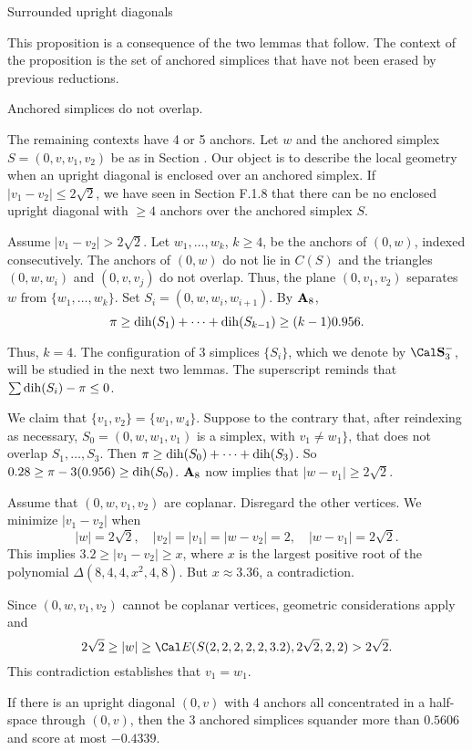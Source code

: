 \subhead {} Surrounded upright diagonals\endsubhead

This proposition is a consequence of the two lemmas that follow.
The context of the proposition is the set of anchored simplices
that have not been erased by previous reductions.

  Anchored simplices do not overlap.
\endproclaim


The remaining contexts have 4 or  5 anchors.
Let $w$ and the anchored simplex $S=(0,v,v_1,v_2)$ 
be as in Section .
Our object is to describe the local geometry when an
upright diagonal is enclosed over an anchored simplex.
If $|v_1-v_2|\le 2\sqrt{2}$, we have seen in Section F.1.8
that there can be no enclosed upright diagonal
with $\ge 4$ anchors over the anchored
simplex $S$.

Assume  $|v_1-v_2|>2\sqrt{2}$.  
Let $w_1,\ldots,w_k$, $k\ge4$,
be the anchors of $(0,w)$, indexed consecutively.
The anchors of $(0,w)$
do not lie in $C(S)$ and the
triangles $(0,w,w_i)$ and $(0,v,v_j)$ do not overlap.
Thus, the plane $(0,v_1,v_2)$ separates $w$ from $\{w_1,\ldots,w_k\}$.
Set $S_i=(0,w,w_i,w_{i+1})$. By ${\bold A}_8$,
$$\pi\ge \operatorname{dih}(S_1)+\cdots+\operatorname{dih}(S_{k-1})\ge (k-1)0.956.$$

Thus, $k=4$.
The configuration of $3$ simplices $\{S_i\}$, which we denote
by $\Sminus$, 
 will be studied 
in the next two lemmas.
The superscript reminds that $\sum\operatorname{dih}(S_i)-\pi\le0$.

 We claim that $\{v_1,v_2\}=\{w_1,w_4\}$.
Suppose to the contrary that, after reindexing as necessary,
$S_0=(0,w,w_1,v_1)$ is a simplex, with $v_1\ne w_1\}$, that does
not overlap $S_1,\ldots,S_3$.
Then $\pi\ge \operatorname{dih}(S_0)+\cdots+\operatorname{dih}(S_3)$.
So $0.28\ge \pi-3(0.956)\ge \operatorname{dih}(S_0)$.  
${\bold A}_8$ now implies that $|w-v_1|\ge 2\sqrt{2}$.

Assume that $(0,w,v_1,v_2)$ are coplanar.  Disregard the
other vertices. We minimize
$|v_1-v_2|$ when 
	$$|w|=2\sqrt{2},\quad |v_2|=|v_1|=|w-v_2|=2,\quad |w-v_1|=2\sqrt{2}.$$
This implies
$3.2\ge|v_1-v_2|\ge x$, where $x$ is the largest positive root
of the polynomial $\Delta(8,4,4,x^2,4,8)$.  
But $x\approx 3.36$, a contradiction.

Since $(0,w,v_1,v_2)$ cannot be coplanar vertices, geometric
considerations apply and
$$2\sqrt{2}\ge |w| \ge {\Cal E}(S(2,2,2,2,2,3.2),2\sqrt{2},2,2)>2\sqrt{2}.$$
This contradiction establishes that $v_1=w_1$.


  If there is an upright diagonal $(0,v)$ with
4 anchors all concentrated in a half-space through $(0,v)$, then
the 3 anchored simplices squander more than $0.5606$ and score
at most $-0.4339$.
\endproclaim


